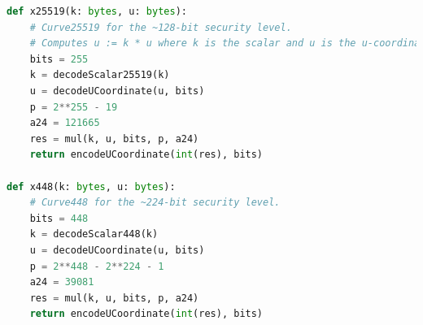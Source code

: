 \begin{lstlisting}[language=python, caption = X25519与X448的Python示例, label=lst-x25519x448]
def x25519(k: bytes, u: bytes):
    # Curve25519 for the ~128-bit security level.
    # Computes u := k * u where k is the scalar and u is the u-coordinate.
    bits = 255
    k = decodeScalar25519(k)
    u = decodeUCoordinate(u, bits)
    p = 2**255 - 19
    a24 = 121665
    res = mul(k, u, bits, p, a24)
    return encodeUCoordinate(int(res), bits)

def x448(k: bytes, u: bytes):
    # Curve448 for the ~224-bit security level.
    bits = 448
    k = decodeScalar448(k)
    u = decodeUCoordinate(u, bits)
    p = 2**448 - 2**224 - 1
    a24 = 39081
    res = mul(k, u, bits, p, a24)
    return encodeUCoordinate(int(res), bits)
\end{lstlisting}

